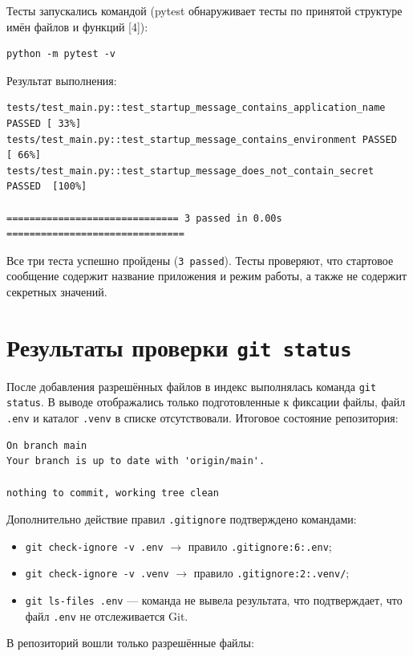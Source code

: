 \documentclass[12pt,a4paper]{article}
\begin{document}
Тесты запускались командой (pytest обнаруживает тесты по принятой структуре имён файлов и функций [4]):

\begin{lstlisting}
python -m pytest -v
\end{lstlisting}

Результат выполнения:

\begin{lstlisting}
tests/test_main.py::test_startup_message_contains_application_name PASSED [ 33%]
tests/test_main.py::test_startup_message_contains_environment PASSED     [ 66%]
tests/test_main.py::test_startup_message_does_not_contain_secret PASSED  [100%]

============================== 3 passed in 0.00s ===============================
\end{lstlisting}

Все три теста успешно пройдены (\texttt{3 passed}). Тесты проверяют, что стартовое сообщение содержит название приложения и режим работы, а также не содержит секретных значений.

\section{Результаты проверки \texttt{git status}}

После добавления разрешённых файлов в индекс выполнялась команда \texttt{git status}. В выводе отображались только подготовленные к фиксации файлы, файл \texttt{.\allowbreak{}env} и каталог \texttt{.\allowbreak{}venv} в списке отсутствовали. Итоговое состояние репозитория:

\begin{lstlisting}
On branch main
Your branch is up to date with 'origin/main'.

nothing to commit, working tree clean
\end{lstlisting}

Дополнительно действие правил \texttt{.\allowbreak{}gitignore} подтверждено командами:

\begin{itemize}
\item \texttt{git check-ignore -v .\allowbreak{}env} $\rightarrow$ правило \texttt{.\allowbreak{}gitignore:6:.\allowbreak{}env};
\item \texttt{git check-ignore -v .\allowbreak{}venv} $\rightarrow$ правило \texttt{.\allowbreak{}gitignore:2:.\allowbreak{}venv/\allowbreak{}};
\item \texttt{git ls-files .\allowbreak{}env} — команда не вывела результата, что подтверждает, что файл \texttt{.\allowbreak{}env} не отслеживается Git.
\end{itemize}
В репозиторий вошли только разрешённые файлы:
\end{document}
